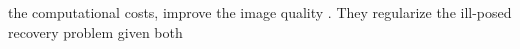 the computational costs, improve
the image quality
\cite{article:OzkanITUFFC2018,article:BessonITUFFC2018,article:BerthonPMB2018,article:BessonITUFFC2016,article:DavidJASA2015,article:ZhangUlt2013,proc:SchiffnerIUS2013a,proc:SchiffnerIUS2013b,proc:SchiffnerIUS2012,article:SchiffnerBMT2012,proc:SchiffnerIUS2011}.
They regularize
the ill-posed recovery problem given both
